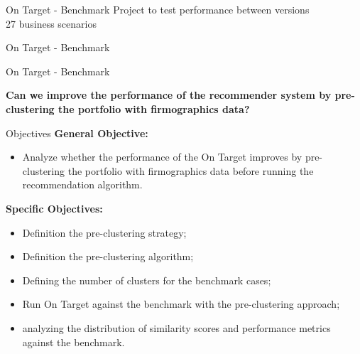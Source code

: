 
\begin{frame}{On Target - Benchmark} \pause
    \vspace{0.5cm}
    Project to test performance between versions \\ \pause
    \vspace{0.5cm}
    27 business scenarios
\end{frame}

%

\begin{frame}{On Target - Benchmark}
\end{frame}


\begin{frame}{On Target - Benchmark}
\end{frame}


\begin{frame}{}
    \begin{center}
        \huge{\textbf{Can we improve the performance of the recommender system by pre-clustering the portfolio \pause
        with firmographics data?}}
    \end{center}
\end{frame}


\begin{frame}{Objectives} \pause
\textbf{General Objective:\\} \pause
\begin{itemize}
    \item Analyze whether the performance of the On Target improves by pre-clustering the portfolio with firmographics data before running the recommendation algorithm.  \pause
\end{itemize}
\vspace{0.5cm}
\textbf{Specific Objectives:\\} \pause
\begin{itemize}
    \item Definition the pre-clustering strategy; \pause
    \item Definition the pre-clustering algorithm; \pause
    \item Defining the number of clusters for the benchmark cases; \pause
    \item Run On Target against the benchmark with the pre-clustering approach; \pause
    \item analyzing the distribution of similarity scores and performance metrics against the benchmark.
\end{itemize}
\end{frame}